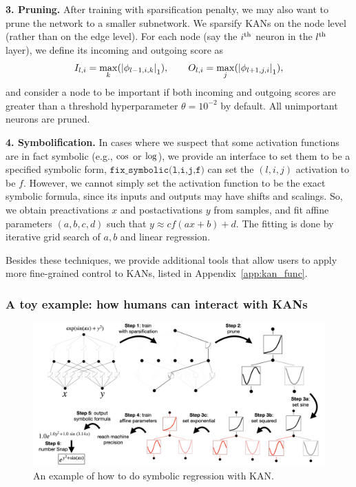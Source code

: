 \documentclass{article}
\numberwithin{equation}{section}
\numberwithin{figure}{section}
\begin{document}
{\bf 3. Pruning.} After training with sparsification penalty, we may also want to prune the network to a smaller subnetwork. We sparsify KANs on the node level (rather than on the edge level). For each node (say the $i^{\rm th}$ neuron in the $l^{\rm th}$ layer), we define its incoming and outgoing score as 
\begin{equation}
    I_{l,i} = \underset{k}{\rm max}(\left|\phi_{l-1,i,k}\right|_1), \qquad O_{l,i} = \underset{j}{\rm max}(\left|\phi_{l+1,j,i}\right|_1),
\end{equation}
and consider a node to be important if both incoming and outgoing scores are greater than a threshold hyperparameter $\theta=10^{-2}$ by default. All unimportant neurons are pruned.

{\bf 4. Symbolification.} In cases where we suspect that some activation functions are in fact symbolic (e.g., ${\rm cos}$ or ${\rm log}$), we provide an interface to set them to be a specified symbolic form, $\texttt{fix\_symbolic(l,i,j,f)}$ can set the $(l,i,j)$ activation to be $f$. However, we cannot simply set the activation function to be the exact symbolic formula, since its inputs and outputs may have shifts and scalings. So, we obtain preactivations $x$ and postactivations $y$ from samples, and fit affine parameters $(a,b,c,d)$ such that 
$y\approx cf(ax+b)+d$. The fitting is done by iterative grid search of $a, b$ and linear regression.

Besides these techniques, we provide additional tools that allow users to apply more fine-grained control to KANs, listed in Appendix~\ref{app:kan_func}.

\subsubsection{A toy example: how humans can interact with KANs}\label{subsubsec:interative-example}

\begin{figure}[t]
    \centering
    \includegraphics[width=1\linewidth]{./figs/sr.png}
    \caption{An example of how to  do symbolic regression with KAN.}
    \label{fig:interactive}
\end{figure}
\end{document}
